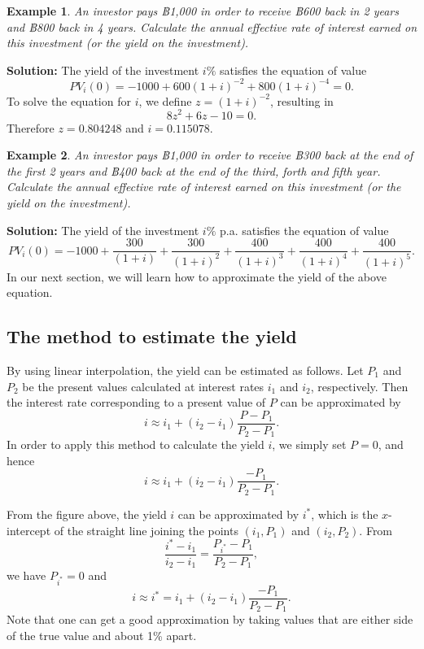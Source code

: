 \documentclass[
]{book}
\theoremstyle{definition}
\theoremstyle{definition}
\newtheorem{example}{Example}[chapter]
\theoremstyle{definition}
\theoremstyle{definition}
\theoremstyle{remark}
\begin{document}
\begin{example}
\emph{An investor pays ฿1,000 in order to receive ฿600 back in 2 years and
฿800 back in 4 years. Calculate the annual effective rate of interest
earned on this investment (or the yield on the investment).}
\end{example}

\textbf{Solution:} The yield of the investment \(i\%\) satisfies the equation
of value \[PV_i(0) =  -1000 + 600(1+i)^{-2} + 800(1+i)^{-4} = 0.\] To
solve the equation for \(i\), we define \(z = (1+i)^{-2}\), resulting in
\[8z^2 + 6z - 10 = 0.\] Therefore \(z = 0.804248\) and \(i = 0.115078.\)

\begin{example}
\protect\hypertarget{exm:exampleYield}{}\label{exm:exampleYield}\emph{An investor pays ฿1,000 in order to receive ฿300 back at the end of the
first 2 years and ฿400 back at the end of the third, forth and fifth
year. Calculate the annual effective rate of interest earned on this
investment (or the yield on the investment).}
\end{example}

\textbf{Solution:} The yield of the investment \(i\%\) p.a. satisfies the
equation of value
\[PV_i(0) =  -1000 + \frac{300}{(1+i)} + \frac{300}{(1+i)^{2}} + \frac{400}{(1+i)^{3}} +  \frac{400}{(1+i)^{4}} + \frac{400}{(1+i)^{5}}.\]
In our next section, we will learn how to approximate the yield of the
above equation.

\hypertarget{the-method-to-estimate-the-yield}{%
\subsection{The method to estimate the yield}\label{the-method-to-estimate-the-yield}}

By using linear interpolation, the yield can be estimated as follows.
Let \(P_1\) and \(P_2\) be the present values calculated at interest rates
\(i_1\) and \(i_2\), respectively. Then the interest rate corresponding to a
present value of \(P\) can be approximated by
\[i \approx i_1 + (i_2 - i_1) \frac{P - P_1}{P_2 - P_1}.\] In order to
apply this method to calculate the yield \(i\), we simply set \(P = 0\), and
hence \[i \approx i_1 + (i_2 - i_1) \frac{ - P_1}{P_2 - P_1}.\]

From the figure above, the yield \(i\) can be approximated by \(i^*\), which
is the \(x\)-intercept of the straight line joining the points \((i_1,P_1)\)
and \((i_2,P_2)\). From
\[\frac{i^* -i_1}{i_2 - i_1} = \frac{P_{i^*} - P_1}{P_2 - P_1},\] we
have \(P_{i^*} = 0\) and
\[i \approx i^* =  i_1 + (i_2 - i_1) \frac{ - P_1}{P_2 - P_1}.\] Note
that one can get a good approximation by taking values that are either
side of the true value and about 1\% apart.
\end{document}
